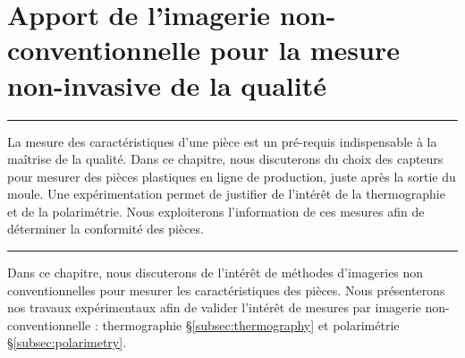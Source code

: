 
\lhead[\fancyplain{}{\leftmark}]%
      {\fancyplain{}{}} %
\chead[\fancyplain{}{}]%
      {\fancyplain{}{}}
\rhead[\fancyplain{}{}]%
      {\fancyplain{}{\rightmark}}%
\lfoot[\fancyplain{}{}]%
      {\fancyplain{}{}}
\cfoot[\fancyplain{}{\thepage}]%
      {\fancyplain{}{\thepage}} %
\rfoot[\fancyplain{}{}]%
     {\fancyplain{}{\scriptsize}}



\chapter{Apport de l'imagerie non-conventionnelle pour la mesure non-invasive de la qualité}
\label{ch:measure}


\begin{center}
\rule{0.7\linewidth}{.5pt}
\begin{minipage}{0.7\linewidth}

	La mesure des caractéristiques d'une pièce est un pré-requis indispensable à la maîtrise de la qualité.
	Dans ce chapitre, nous discuterons du choix des capteurs pour mesurer des pièces plastiques en ligne de production, juste après la sortie du moule.
	Une expérimentation permet de justifier de l'intérêt de la thermographie et de la polarimétrie.
	Nous exploiterons l'information de ces mesures afin de déterminer la conformité des pièces.

\end{minipage}
\rule{0.7\linewidth}{.5pt}
\end{center}

\minitoc
\newpage

Dans ce chapitre, nous discuterons de l'intérêt de méthodes d'imageries non conventionnelles pour mesurer les caractéristiques des pièces.
Nous présenterons nos travaux expérimentaux afin de valider l'intérêt de mesures par imagerie non-conventionnelle : thermographie §\ref{subsec:thermography} et polarimétrie §\ref{subsec:polarimetry}.


